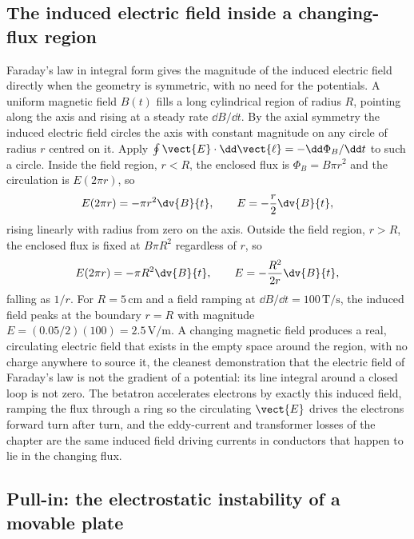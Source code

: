

\subsection{The induced electric field inside a changing-flux region}

Faraday's law in integral form gives the magnitude of the induced
electric field directly when the geometry is symmetric, with no need for
the potentials. A uniform magnetic field $B(t)$ fills a long cylindrical
region of radius $R$, pointing along the axis and rising at a steady rate
$\dd B/\dd t$. By the axial symmetry the induced electric field circles
the axis with constant magnitude on any circle of radius $r$ centred on
it. Apply $\oint\vect{E}\cdot\dd\vect{\ell} = -\dd\Phi_B/\dd t$ to such a
circle. Inside the field region, $r < R$, the enclosed flux is
$\Phi_B = B\pi r^{2}$ and the circulation is $E(2\pi r)$, so
\[
E(2\pi r) = -\pi r^{2}\dv{B}{t}, \qquad E = -\frac{r}{2}\dv{B}{t},
\]
rising linearly with radius from zero on the axis. Outside the field
region, $r > R$, the enclosed flux is fixed at $B\pi R^{2}$ regardless of
$r$, so
\[
E(2\pi r) = -\pi R^{2}\dv{B}{t}, \qquad E = -\frac{R^{2}}{2r}\dv{B}{t},
\]
falling as $1/r$. For $R = 5\,\si{\centi\meter}$ and a field ramping at
$\dd B/\dd t = 100\,\si{\tesla\per\second}$, the induced field peaks at
the boundary $r = R$ with magnitude $E = (0.05/2)(100) = 2.5\,\si{\volt
\per\meter}$. A changing magnetic field produces a real, circulating
electric field that exists in the empty space around the region, with no
charge anywhere to source it, the cleanest demonstration that the
electric field of Faraday's law is not the gradient of a potential: its
line integral around a closed loop is not zero. The betatron accelerates
electrons by exactly this induced field, ramping the flux through a ring
so the circulating $\vect{E}$ drives the electrons forward turn after
turn, and the eddy-current and transformer losses of the chapter are the
same induced field driving currents in conductors that happen to lie in
the changing flux.

\subsection{Pull-in: the electrostatic instability of a movable plate}

